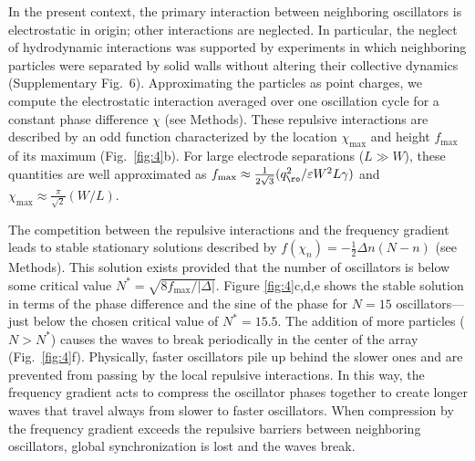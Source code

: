 In the present context, the primary interaction between neighboring oscillators is electrostatic in origin; other interactions are neglected. In particular, the neglect of hydrodynamic interactions was supported by experiments in which neighboring particles were separated by solid walls without altering their collective dynamics (Supplementary Fig.~6).  Approximating the particles as point charges, we compute the electrostatic interaction averaged over one oscillation cycle for a constant phase difference $\chi$ (see Methods). These repulsive interactions are described by an odd function characterized by the location $\chi_{\max}$ and height $f_{\max}$ of its maximum  (Fig.~\ref{fig:4}b).  For large electrode separations ($L\gg W$), these quantities are well approximated as $f_{\max}\approx \tfrac{1}{2\sqrt{3}} (q_{\ro}^2/\varepsilon W^2 L \gamma)$ and $\chi_{\max}\approx\tfrac{\pi}{\sqrt{2}} (W/L)$. 

The competition between the repulsive interactions and the frequency gradient leads to stable stationary solutions described by $f(\chi_n) = -\frac{1}{2}\Delta n(N-n)$ (see Methods). This solution exists provided that the number of oscillators is below some critical value $N^* = \sqrt{8 f_{\max}/\lvert\Delta\rvert}$. Figure \ref{fig:4}c,d,e shows the stable solution in terms of the phase difference and the sine of the phase for $N=15$ oscillators---just below the chosen critical value of $N^*=15.5$. The addition of more particles ($N>N^*$) causes the waves to break periodically in the center of the array (Fig.~\ref{fig:4}f). Physically, faster oscillators pile up behind the slower ones and are prevented from passing by the local repulsive interactions.  In this way, the frequency gradient acts to compress the oscillator phases together to create longer waves that travel always from slower to faster oscillators. When compression by the frequency gradient exceeds the repulsive barriers between neighboring oscillators, global synchronization is lost and the waves break. 

